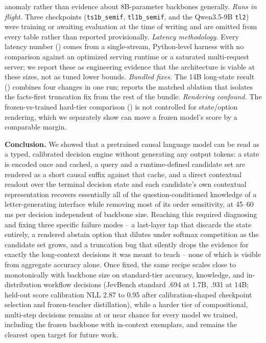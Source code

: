 anomaly rather than evidence about 8B-parameter backbones generally. \textit{Runs in flight.} Three
checkpoints (\texttt{ts1b\_semif}, \texttt{tl1b\_semif}, and the Qwen3.5-9B \texttt{tl2}) were training or
awaiting evaluation at the time of writing and are omitted from every table rather than reported
provisionally. \textit{Latency methodology.} Every latency number () comes from
a single-stream, Python-level harness with no comparison against an optimized serving runtime or a
saturated multi-request server; we report these as engineering evidence that the architecture is viable at
these sizes, not as tuned lower bounds. \textit{Bundled fixes.} The 14B long-state result
() combines four changes in one run;  reports the matched
ablation that isolates the facts-first truncation fix from the rest of the bundle. \textit{Rendering
confound.} The frozen-vs-trained hard-tier comparison () is not controlled for
state/option rendering, which we separately show can move a frozen model's score by a comparable margin.

\textbf{Conclusion.} We showed that a pretrained causal language model can be read as a typed, calibrated
decision engine without generating any output tokens: a state is encoded once and cached, a query and a
runtime-defined candidate set are rendered as a short causal suffix against that cache, and a direct
contextual readout over the terminal decision state and each candidate's own contextual representation
recovers essentially all of the question-conditioned knowledge of a letter-generating interface while
removing most of its order sensitivity, at 45--60\,ms per decision independent of backbone size. Reaching
this required diagnosing and fixing three specific failure modes -- a last-layer tap that discards the
state entirely, a rendered abstain option that dilutes under softmax competition as the candidate set
grows, and a truncation bug that silently drops the evidence for exactly the long-context decisions it was
meant to teach -- none of which is visible from aggregate accuracy alone. Once fixed, the same recipe
scales close to monotonically with backbone size on standard-tier accuracy, knowledge, and in-distribution
workflow decisions (JevBench standard .694 at 1.7B, .931 at 14B; held-out score calibration NLL 2.87 to
0.95 after calibration-shaped checkpoint selection and frozen-teacher distillation), while a harder tier of
compositional, multi-step decisions remains at or near chance for every model we trained, including the
frozen backbone with in-context exemplars, and remains the clearest open target for future work.
